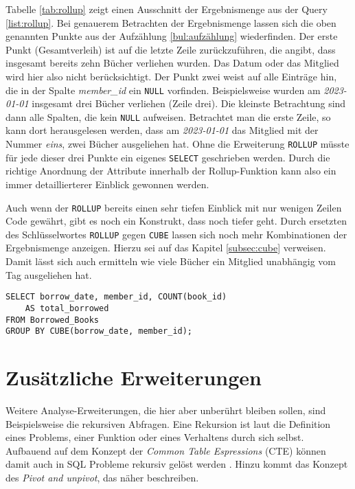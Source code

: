 Tabelle \ref{tab:rollup} zeigt einen Ausschnitt der Ergebnismenge aus der Query \ref{list:rollup}.
Bei genauerem Betrachten der Ergebnismenge lassen sich die oben genannten Punkte
aus der Aufzählung \ref{bul:aufzählung} wiederfinden. Der erste Punkt (Gesamtverleih)
ist auf die letzte Zeile zurückzuführen, die angibt, dass insgesamt bereits zehn
Bücher verliehen wurden. Das Datum oder das Mitglied wird hier also nicht
berücksichtigt. Der Punkt zwei weist auf alle Einträge hin, die in der Spalte
\textit{member\_id} ein \texttt{NULL} vorfinden. Beispielsweise wurden am \textit{2023-01-01}
insgesamt drei Bücher verliehen (Zeile drei). Die kleinste Betrachtung sind dann
alle Spalten, die kein \texttt{NULL} aufweisen. Betrachtet man die erste Zeile, so
kann dort herausgelesen werden, dass am \textit{2023-01-01} das Mitglied mit der
Nummer \textit{eins}, zwei Bücher ausgeliehen hat. Ohne die Erweiterung \texttt{ROLLUP}
müsste für jede dieser drei Punkte ein eigenes \texttt{SELECT} geschrieben
werden. Durch die richtige Anordnung der Attribute innerhalb der Rollup-Funktion
kann also ein immer detaillierterer Einblick gewonnen werden.

Auch wenn der \texttt{ROLLUP} bereits einen sehr tiefen Einblick mit nur wenigen
Zeilen Code gewährt, gibt es noch ein Konstrukt, dass noch tiefer geht. Durch ersetzten
des Schlüsselwortes \texttt{ROLLUP} gegen \texttt{CUBE} lassen sich noch mehr Kombinationen
der Ergebnismenge anzeigen. Hierzu sei auf das Kapitel \ref{subsec:cube}
verweisen. Damit lässt sich auch ermitteln wie viele Bücher ein Mitglied unabhängig
vom Tag ausgeliehen hat.

\begin{lstlisting}
SELECT borrow_date, member_id, COUNT(book_id)
	AS total_borrowed
FROM Borrowed_Books
GROUP BY CUBE(borrow_date, member_id);
\end{lstlisting}

\section{Zusätzliche Erweiterungen}
\label{sec:zus_erweiterungen} Weitere Analyse-Erweiterungen, die hier aber unberührt
bleiben sollen, sind Beispielsweise die rekursiven Abfragen. Eine Rekursion ist laut
\citet{benecke1998rekursion} die Definition eines Problems, einer Funktion oder eines
Verhaltens durch sich selbst. Aufbauend auf dem Konzept der \textit{Common Table
Espressions} (CTE) können damit auch in SQL Probleme rekursiv gelöst werden \citep[vgl.][]{Ignacio2022}.
Hinzu kommt das Konzept des \textit{Pivot and unpivot}, das \citet{Nuijten2023}
näher beschreiben.